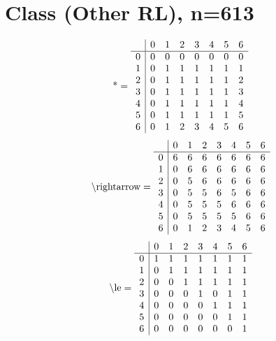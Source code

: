 \documentclass[11pt]{article}
\begin{document}
\section{Class (Other RL), n=613}
\[\text{*} = 
\begin{array}{r | r r r r r r r}
 & 0 & 1 & 2 & 3 & 4 & 5 & 6 \\ \hline
0 & 0 & 0 & 0 & 0 & 0 & 0 & 0 \\
1 & 0 & 1 & 1 & 1 & 1 & 1 & 1 \\
2 & 0 & 1 & 1 & 1 & 1 & 1 & 2 \\
3 & 0 & 1 & 1 & 1 & 1 & 1 & 3 \\
4 & 0 & 1 & 1 & 1 & 1 & 1 & 4 \\
5 & 0 & 1 & 1 & 1 & 1 & 1 & 5 \\
6 & 0 & 1 & 2 & 3 & 4 & 5 & 6 \\
\end{array}
\]
\[\text{\textbackslash rightarrow} = 
\begin{array}{r | r r r r r r r}
 & 0 & 1 & 2 & 3 & 4 & 5 & 6 \\ \hline
0 & 6 & 6 & 6 & 6 & 6 & 6 & 6 \\
1 & 0 & 6 & 6 & 6 & 6 & 6 & 6 \\
2 & 0 & 5 & 6 & 6 & 6 & 6 & 6 \\
3 & 0 & 5 & 5 & 6 & 5 & 6 & 6 \\
4 & 0 & 5 & 5 & 5 & 6 & 6 & 6 \\
5 & 0 & 5 & 5 & 5 & 5 & 6 & 6 \\
6 & 0 & 1 & 2 & 3 & 4 & 5 & 6 \\
\end{array}
\]
\[\text{\textbackslash le} = 
\begin{array}{r | r r r r r r r}
 & 0 & 1 & 2 & 3 & 4 & 5 & 6 \\ \hline
0 & 1 & 1 & 1 & 1 & 1 & 1 & 1 \\
1 & 0 & 1 & 1 & 1 & 1 & 1 & 1 \\
2 & 0 & 0 & 1 & 1 & 1 & 1 & 1 \\
3 & 0 & 0 & 0 & 1 & 0 & 1 & 1 \\
4 & 0 & 0 & 0 & 0 & 1 & 1 & 1 \\
5 & 0 & 0 & 0 & 0 & 0 & 1 & 1 \\
6 & 0 & 0 & 0 & 0 & 0 & 0 & 1 \\
\end{array}
\]
\end{document}
